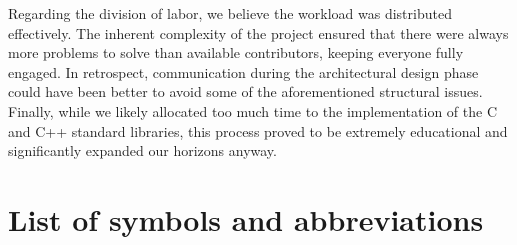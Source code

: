 \documentclass[a4paper,10pt,twoside]{report}
\theoremstyle{definition}
\begin{document}
Regarding the division of labor, we believe the workload was distributed effectively. The inherent complexity of the project ensured that there were always more problems to solve than available contributors, keeping everyone fully engaged. In retrospect, communication during the architectural design phase could have been better to avoid some of the aforementioned structural issues. Finally, while we likely allocated too much time to the implementation of the C and C++ standard libraries, this process proved to be extremely educational and significantly expanded our horizons anyway.


\printbibliography[heading=bibintoc]

\thispagestyle{empty}

\chapter*{List of symbols and abbreviations}
\end{document}
